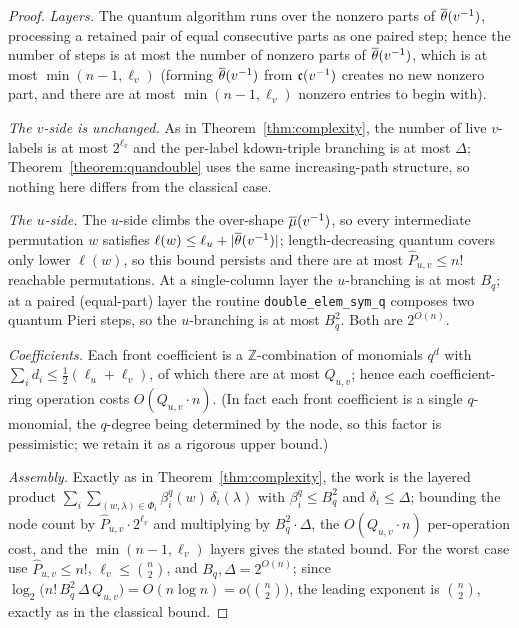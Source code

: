 \documentclass{amsart}
\theoremstyle{definition}
\theoremstyle{remark}
\numberwithin{equation}{section}
\begin{document}
\begin{proof}
\emph{Layers.} The quantum algorithm runs over the nonzero parts of $\overline{\theta}(v^{-1})$, processing a retained pair of equal consecutive parts as one paired step; hence the number of steps is at most the number of nonzero parts of $\overline{\theta}(v^{-1})$, which is at most $\min(n-1,\ell_v)$ (forming $\overline{\theta}(v^{-1})$ from $\mathfrak{c}(v^{-1})$ creates no new nonzero part, and there are at most $\min(n-1,\ell_v)$ nonzero entries to begin with).

\emph{The $v$-side is unchanged.} As in Theorem~\ref{thm:complexity}, the number of live $v$-labels is at most $2^{\ell_v}$ and the per-label kdown-triple branching is at most $\Delta$; Theorem~\ref{theorem:quandouble} uses the same increasing-path structure, so nothing here differs from the classical case.

\emph{The $u$-side.} The $u$-side climbs the over-shape $\overline{\mu}(v^{-1})$, so every intermediate permutation $w$ satisfies $\ell(w)\leq\ell_u+|\overline{\theta}(v^{-1})|$; length-decreasing quantum covers only lower $\ell(w)$, so this bound persists and there are at most $\widehat P_{u,v}\leq n!$ reachable permutations. At a single-column layer the $u$-branching is at most $B_q$; at a paired (equal-part) layer the routine \texttt{double\_elem\_sym\_q} composes two quantum Pieri steps, so the $u$-branching is at most $B_q^2$. Both are $2^{O(n)}$.

\emph{Coefficients.} Each front coefficient is a $\mathbb Z$-combination of monomials $q^d$ with $\sum_i d_i\leq\tfrac12(\ell_u+\ell_v)$, of which there are at most $Q_{u,v}$; hence each coefficient-ring operation costs $O(Q_{u,v}\cdot n)$. (In fact each front coefficient is a single $q$-monomial, the $q$-degree being determined by the node, so this factor is pessimistic; we retain it as a rigorous upper bound.)

\emph{Assembly.} Exactly as in Theorem~\ref{thm:complexity}, the work is the layered product $\sum_i\sum_{(w,\lambda)\in\Phi_i}\beta^q_i(w)\,\delta_i(\lambda)$ with $\beta^q_i\leq B_q^2$ and $\delta_i\leq\Delta$; bounding the node count by $\widehat P_{u,v}\cdot 2^{\ell_v}$ and multiplying by $B_q^2\cdot\Delta$, the $O(Q_{u,v}\cdot n)$ per-operation cost, and the $\min(n-1,\ell_v)$ layers gives the stated bound. For the worst case use $\widehat P_{u,v}\leq n!$, $\ell_v\leq\binom{n}{2}$, and $B_q,\Delta=2^{O(n)}$; since $\log_2\!\big(n!\,B_q^2\,\Delta\,Q_{u,v}\big)=O(n\log n)=o\!\big(\binom{n}{2}\big)$, the leading exponent is $\binom{n}{2}$, exactly as in the classical bound.
\end{proof}
\end{document}
